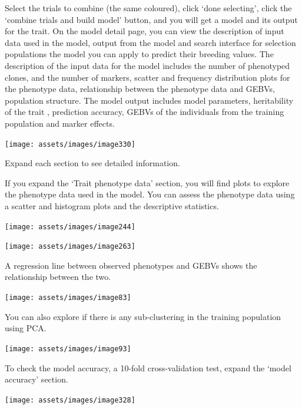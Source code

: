 \documentclass[
  12pt,
]{book}
\begin{document}
Select the trials to combine (the same coloured), click `done selecting', click the `combine trials and build model' button, and you will get a model and its output for the trait. On the model detail page, you can view the description of input data used in the model, output from the model and search interface for selection populations the model you can apply to predict their breeding values. The description of the input data for the model includes the number of phenotyped clones, and the number of markers, scatter and frequency distribution plots for the phenotype data, relationship between the phenotype data and GEBVs, population structure. The model output includes model parameters, heritability of the trait , prediction accuracy, GEBVs of the individuals from the training population and marker effects.

\begin{center}\texttt{[image: assets/images/image330]} \end{center}

Expand each section to see detailed information.

If you expand the `Trait phenotype data' section, you will find plots to explore the phenotype data used in the model. You can assess the phenotype data using a scatter and histogram plots and the descriptive statistics.

\begin{center}\texttt{[image: assets/images/image244]} \end{center}

\begin{center}\texttt{[image: assets/images/image263]} \end{center}

A regression line between observed phenotypes and GEBVs shows the relationship between the two.

\begin{center}\texttt{[image: assets/images/image83]} \end{center}

You can also explore if there is any sub-clustering in the training population using PCA.

\begin{center}\texttt{[image: assets/images/image93]} \end{center}

To check the model accuracy, a 10-fold cross-validation test, expand the `model accuracy' section.

\begin{center}\texttt{[image: assets/images/image328]} \end{center}
\end{document}
